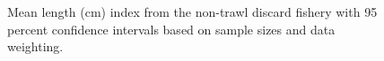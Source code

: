 \documentclass[
]{scrartcl}
\begin{document}
\begin{figure}[H]


\caption{\label{fig-meanlt-ntdis}Mean length (cm) index from the
non-trawl discard fishery with 95 percent confidence intervals based on
sample sizes and data weighting.}

\end{figure}%
\end{document}

